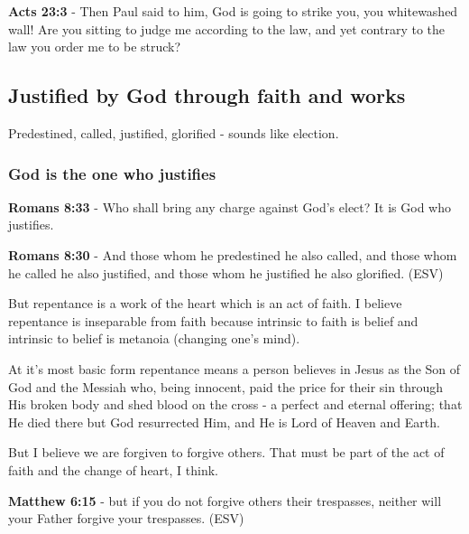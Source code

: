 \documentclass[11pt]{article}
\begin{document}
\textbf{Acts 23:3} - Then Paul said to him, God is going to strike you, you whitewashed wall! Are you sitting to judge me according to the law, and yet contrary to the law you order me to be struck?

\subsection{Justified by God through faith and works}
\label{sec:org07200dc}
Predestined, called, justified, glorified - sounds like election.
\subsubsection{God is the one who justifies}
\label{sec:org3618f6f}

\textbf{Romans 8:33} - Who shall bring any charge against God's elect? It is God who justifies.

\textbf{Romans 8:30} - And those whom he predestined he also called, and those whom he called he also justified, and those whom he justified he also glorified. (ESV)

But repentance is a work of the heart which is an act of faith.
I believe repentance is inseparable from faith because intrinsic to faith is belief and intrinsic to belief is metanoia (changing one's mind).

At it's most basic form repentance means a person believes in Jesus as the Son of God and the Messiah who, being innocent, paid the price for their sin through His broken body and shed blood on the cross - a perfect and eternal offering; that He died there but God resurrected Him, and He is Lord of Heaven and Earth.

But I believe we are forgiven to forgive others. That must be part of the act of faith and the change of heart, I think.

\textbf{Matthew 6:15} - but if you do not forgive others their trespasses, neither will your Father forgive your trespasses. (ESV)
\end{document}
